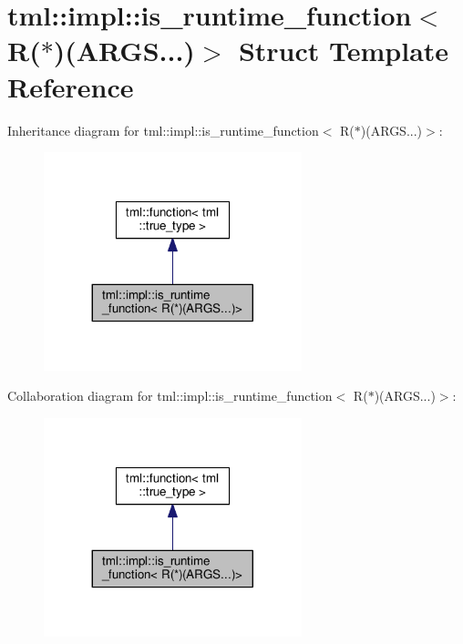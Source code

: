 \hypertarget{structtml_1_1impl_1_1is__runtime__function_3_01_r_07_5_08_07_a_r_g_s_8_8_8_08_4}{\section{tml\+:\+:impl\+:\+:is\+\_\+runtime\+\_\+function$<$ R($\ast$)(A\+R\+G\+S...)$>$ Struct Template Reference}
\label{structtml_1_1impl_1_1is__runtime__function_3_01_r_07_5_08_07_a_r_g_s_8_8_8_08_4}
}


Inheritance diagram for tml\+:\+:impl\+:\+:is\+\_\+runtime\+\_\+function$<$ R($\ast$)(A\+R\+G\+S...)$>$\+:
\nopagebreak
\begin{figure}[H]
\begin{center}
\leavevmode
\includegraphics[width=212pt]{structtml_1_1impl_1_1is__runtime__function_3_01_r_07_5_08_07_a_r_g_s_8_8_8_08_4__inherit__graph}
\end{center}
\end{figure}


Collaboration diagram for tml\+:\+:impl\+:\+:is\+\_\+runtime\+\_\+function$<$ R($\ast$)(A\+R\+G\+S...)$>$\+:
\nopagebreak
\begin{figure}[H]
\begin{center}
\leavevmode
\includegraphics[width=212pt]{structtml_1_1impl_1_1is__runtime__function_3_01_r_07_5_08_07_a_r_g_s_8_8_8_08_4__coll__graph}
\end{center}
\end{figure}
